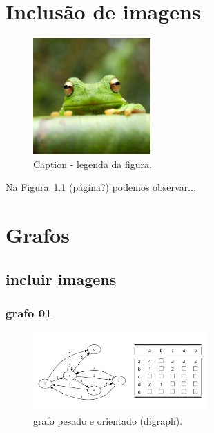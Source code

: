 \documentclass[a4wide]{report}
\begin{document}
\chapter{Inclusão de imagens}

\begin{figure}[hbt]
    \centering
    \includegraphics[width=0.40\textwidth]{frog.jpg} %
    \caption{Caption - legenda da figura.\label{fig:imagem}}
    
\end{figure}

Na Figura~\ref{fig:imagem} (página?) podemos observar...

\chapter{Grafos}

\section{incluir imagens}

\subsection{grafo 01} \label{subsec:g01} 
\begin{figure}[hbt]
    \centering
    \includegraphics[width=0.6\textwidth]{grafo-d-matrizadj.PNG} 
    \caption{grafo pesado e orientado (digraph).\label{fig:grafo-d}}  
\end{figure}
\end{document}
